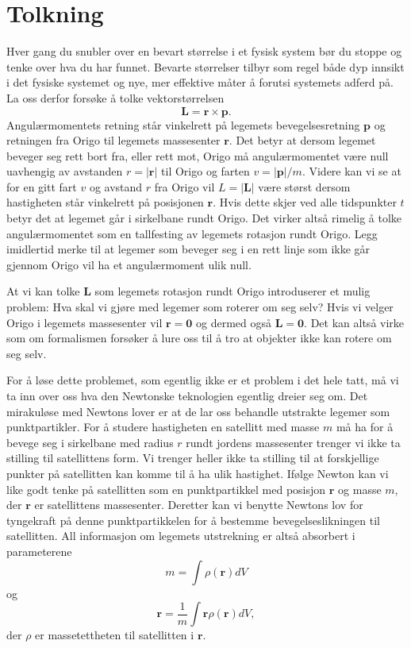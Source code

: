 \documentclass[twoside,utf8]{article}
\begin{document}
\section{Tolkning}
Hver gang du snubler over en bevart størrelse i et fysisk system bør du stoppe og tenke over hva du har funnet. Bevarte størrelser tilbyr som regel både dyp innsikt i det fysiske systemet og nye, mer effektive måter å forutsi systemets adferd på. La oss derfor forsøke å tolke vektorstørrelsen
\[
\mathbf{L} = \mathbf{r}\times\mathbf{p}.
\]
Angulærmomentets retning står vinkelrett på legemets bevegelsesretning $\mathbf{p}$ og retningen fra Origo til legemets massesenter $\mathbf{r}$.
Det betyr at dersom legemet beveger seg rett bort fra, eller rett mot, Origo må angulærmomentet være null uavhengig av avstanden $r=|\mathbf{r}|$ til Origo og farten $v=|\mathbf{p}|/m$. Videre kan vi se at for en gitt fart $v$ og avstand $r$ fra Origo vil $L=|\mathbf{L}|$ være størst dersom hastigheten står vinkelrett på posisjonen $\mathbf{r}$. Hvis dette skjer ved alle tidspunkter $t$ betyr det at legemet går i sirkelbane rundt Origo. Det virker altså rimelig å tolke angulærmomentet som en tallfesting av legemets rotasjon rundt Origo. Legg imidlertid merke til at legemer som beveger seg i en rett linje som ikke går gjennom Origo vil ha et angulærmoment ulik null.

At vi kan tolke $\mathbf{L}$ som legemets rotasjon rundt Origo introduserer et mulig problem: Hva skal vi gjøre med legemer som roterer om seg selv? Hvis vi velger Origo i legemets massesenter vil $\mathbf{r}=\mathbf{0}$ og dermed også $\mathbf{L}=\mathbf{0}$. Det kan altså virke som om formalismen forsøker å lure oss til å tro at objekter ikke kan rotere om seg selv.

For å løse dette problemet, som egentlig ikke er et problem i det hele tatt, må vi ta inn over oss hva den Newtonske teknologien egentlig dreier seg om.
Det mirakuløse med Newtons lover er at de lar oss behandle utstrakte legemer som punktpartikler. For å studere hastigheten en satellitt med masse $m$ må ha for å bevege seg i sirkelbane med radius $r$ rundt jordens massesenter trenger vi ikke ta stilling til satellittens form. Vi trenger heller ikke ta stilling til at forskjellige punkter på satellitten kan komme til å ha ulik hastighet. Ifølge Newton kan vi like godt tenke på satellitten som en punktpartikkel med posisjon $\mathbf{r}$ og masse $m$, der $\mathbf{r}$ er satellittens massesenter. Deretter kan vi benytte Newtons lov for tyngekraft på denne punktpartikkelen for å bestemme bevegelseslikningen til satellitten. All informasjon om legemets utstrekning er altså absorbert i parameterene
\[
m = \int \rho(\mathbf{r}) dV
\]
og
\[
\mathbf{r} = \frac{1}{m}\int \mathbf{r} \rho(\mathbf{r}) dV,
\]
der $\rho$ er massetettheten til satellitten i $\mathbf{r}$.
\end{document}
